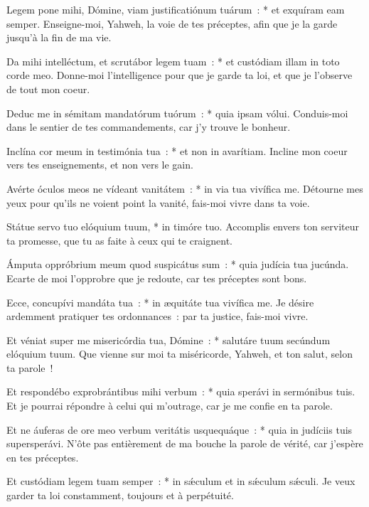 \begin{paracol}{2}

\LigneParacol
{Legem pone mihi, Dómine, viam justificatiónum tuárum~: * et exquíram eam semper.}
{Enseigne-moi, Yahweh, la voie de tes préceptes, afin que je la garde jusqu'à la fin de ma vie.}

\LigneParacol
{Da mihi intelléctum, et scrutábor legem tuam~: * et custódiam illam in toto corde meo.}
{Donne-moi l'intelligence pour que je garde ta loi, et que je l'observe de tout mon coeur.}

\LigneParacol
{Deduc me in sémitam mandatórum tuórum~: * quia ipsam vólui.}
{Conduis-moi dans le sentier de tes commandements, car j'y trouve le bonheur.}

\LigneParacol
{Inclína cor meum in testimónia tua~: * et non in avarítiam.}
{Incline mon coeur vers tes enseignements, et non vers le gain.}

\LigneParacol
{Avérte óculos meos ne vídeant vanitátem~: * in via tua vivífica me.}
{Détourne mes yeux pour qu'ils ne voient point la vanité, fais-moi vivre dans ta voie.}

\LigneParacol
{Státue servo tuo elóquium tuum, * in timóre tuo.}
{Accomplis envers ton serviteur ta promesse, que tu as faite à ceux qui te craignent.}

\LigneParacol
{Ámputa oppróbrium meum quod suspicátus sum~: * quia judícia tua jucúnda.}
{Ecarte de moi l'opprobre que je redoute, car tes préceptes sont bons.}

\LigneParacol
{Ecce, concupívi mandáta tua~: * in æquitáte tua vivífica me.}
{Je désire ardemment pratiquer tes ordonnances~: par ta justice, fais-moi vivre. }

\LigneParacol
{Et véniat super me misericórdia tua, Dómine~: * salutáre tuum secúndum elóquium tuum.}
{Que vienne sur moi ta miséricorde, Yahweh, et ton salut, selon ta parole~!}

\LigneParacol
{Et respondébo exprobrántibus mihi verbum~: * quia sperávi in sermónibus tuis.}
{Et je pourrai répondre à celui qui m'outrage, car je me confie en ta parole.}

\LigneParacol
{Et ne áuferas de ore meo verbum veritátis usquequáque~: * quia in judíciis tuis supersperávi.}
{N'ôte pas entièrement de ma bouche la parole de vérité, car j'espère en tes préceptes.}

\LigneParacol
{Et custódiam legem tuam semper~: * in sǽculum et in sǽculum sǽculi.}
{Je veux garder ta loi constamment, toujours et à perpétuité.}


\end{paracol}
